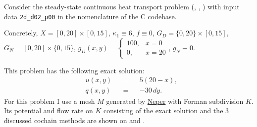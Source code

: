 \begin{example}
  \label{idec/diffusion/continuous/steady_state/examples/2d_d02_p00-example}
  Consider the steady-state continuous heat transport problem
  (,
   ,
   )
  with input data \verb|2d_d02_p00| in the nomenclature of the C codebase.

  Concretely,
    $X = [0, 20] \times [0, 15]$,
    $\kappa_1 \equiv 6$,
    $f \equiv 0$,
    $G_D = \{0, 20\} \times [0, 15]$,
    $G_N = [0, 20] \times \{0, 15\}$,
    $g_D(x, y) = \begin{cases} 100, & x = 0 \\ 0, & x = 20 \end{cases}$,
    $g_N \equiv 0$.

  This problem has the following exact solution:
  \begin{subequations}
    \begin{alignat}{3}
      & u(x, y) && = && 5 (20 - x), \\
      & q(x, y) && = && -30 \, d y.
    \end{alignat}
  \end{subequations}
  For this problem I use a mesh $M$ generated by
  \href{https://neper.info/}{Neper} with Forman subdivision $K$.
  Its potential and flow rate on $K$ consisting of the exact solution and the
  $3$ discussed cochain methods are shown on
  and
  .
\end{example}
